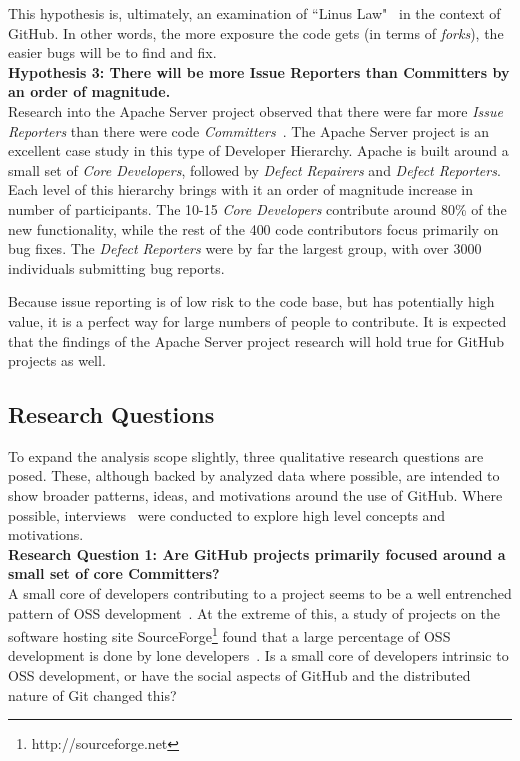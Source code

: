 \documentclass{proc}
\begin{document}
This hypothesis is, ultimately, an examination of ``Linus Law"~\cite{raymond1999cathedral} in the context of GitHub. In other words, the more exposure the code gets (in terms of \emph{forks}), the easier bugs will be to find and fix.\\

\noindent \textbf{Hypothesis 3: There will be more Issue Reporters than Committers by an order of magnitude.}\\
Research into the Apache Server project observed that there were far more \emph{Issue Reporters} than there were code \emph{Committers}~\cite{mockus2000case}. The Apache Server project is an excellent case study in this type of Developer Hierarchy. Apache is built around a small set of {\it Core Developers}, followed by {\it Defect Repairers} and {\it Defect Reporters}. Each level of this hierarchy brings with it an order of magnitude increase in number of participants. The 10-15 {\it Core Developers} contribute around 80\% of the new functionality, while the rest of the 400 code contributors focus primarily on bug fixes. The {\it Defect Reporters} were by far the largest group, with over 3000 individuals submitting bug reports.

Because issue reporting is of low risk to the code base, but has potentially high value, it is a perfect way for large numbers of people to contribute. It is expected that the findings of the Apache Server project research will hold true for GitHub projects as well.

\subsection{Research Questions}
To expand the analysis scope slightly, three qualitative research questions are posed. These, although backed by analyzed data where possible, are intended to show broader patterns, ideas, and motivations around the use of GitHub. Where possible, interviews~\cite{begel2013social} were conducted to explore high level concepts and motivations.\\

\noindent \textbf{Research Question 1: Are GitHub projects primarily focused around a small set of core Committers?}\\
A small core of developers contributing to a project seems to be a well entrenched pattern of OSS development~\cite{mockus2000case,mockus2002two,krishnamurthy2002cave}. At the extreme of this, a study of projects on the software hosting site SourceForge\footnote{http://sourceforge.net} found that a large percentage of OSS development is done by lone developers~\cite{krishnamurthy2002cave}. Is a small core of developers intrinsic to OSS development, or have the social aspects of GitHub and the distributed nature of Git changed this?\\
\end{document}
